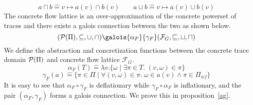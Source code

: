   \[
     a \sqcap b \mathrel{\hat=} v \mapsto a(v) \cap b(v) \qquad 
     a \sqcup b \mathrel{\hat=} v \mapsto a(v) \cup b(v)
  \]
%
%
The concrete flow lattice is an over-approximation of the concrete powerset of
traces and there exists a galois connection between the two as shown below. 
\[
  (\powerset({\Pi}),\subseteq,\cup,\cap)
    \galois{\alpha_{F}}{\gamma_{F}}
    (\mathcal{F}_{G},\sqsubseteq,\sqcup,\sqcap)
\]
We define the abstraction and concretization functions between the concrete
trace domain $\mathcal{P}({\Pi})$ and concrete flow lattice $\mathcal{F}_{G}$.
\[
  \alpha_{F}(T) \mathrel{\hat=} \lambda v. \{\omega \mid \exists
  \pi \in T.\; (v,\omega) \in \pi \} 
\]
\[
  \gamma_{F}(a) \mathrel{\hat=} \{\pi \in \Pi \mid \forall (v,\omega) \in \pi.\;
  \omega \in a(v) \wedge \pi \in \Pi_{wf} \}
\]
%
It is easy to see that $\alpha_F \circ \gamma_{F}$ is deflationary while 
$\gamma_F \circ \alpha_F$ is inflationary, and the pair $(\alpha_F, \gamma_F)$
forms a galois connection. We prove this in proposition~\ref{ag}. 
%


